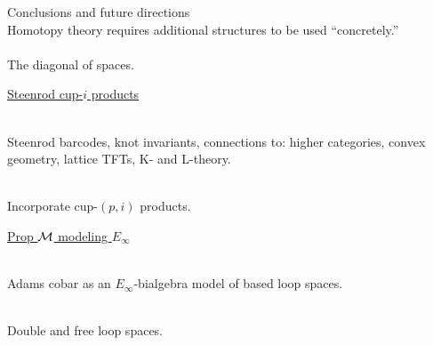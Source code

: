 
\begin{frame}{Conclusions and future directions}
	\pause
	 \\
	Homotopy theory requires additional structures to be used ``concretely.'' \\

	\medskip\pause
	 \\
	The diagonal of spaces.

	\medskip\pause
	\underline{Steenrod cup-$i$ products}

	\medskip\pause
	 \\
	Steenrod barcodes, knot invariants, connections to: higher categories, convex geometry, lattice TFTs, K- and L-theory.

	\smallskip\pause
	 \\
	Incorporate cup-$(p,i)$ products.

	\medskip\pause
	\underline{Prop $\mathcal{M}$ modeling $E_\infty$}

	\medskip\pause
	 \\
	Adams cobar as an $E_\infty$-bialgebra model of based loop spaces.

	\smallskip\pause
	 \\
	Double and free loop spaces.
\end{frame}